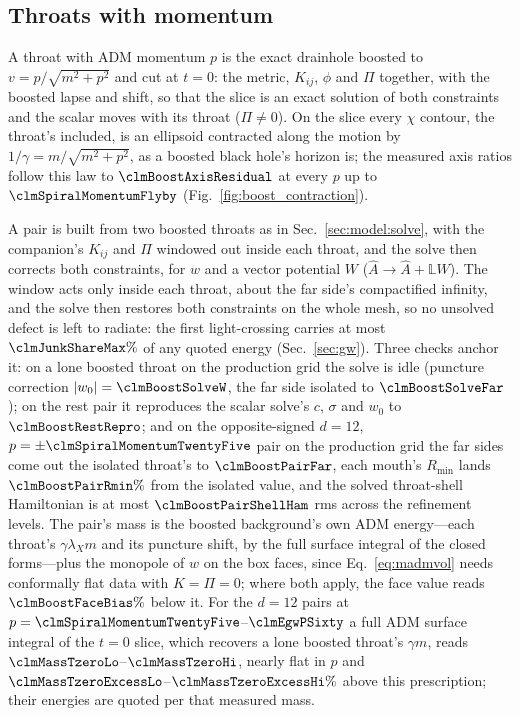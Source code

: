 \documentclass[twocolumn,floatfix,aps,prd,superscriptaddress,nofootinbib]{revtex4-2}
\begin{document}
\subsection{Throats with momentum}
\label{sec:model:boost}

A throat with ADM momentum $p$ is the exact drainhole boosted to $v=p/\sqrt{m^2+p^2}$ and cut at $t=0$: the metric, $K_{ij}$, $\phi$ and $\Pi$ together, with the boosted lapse and shift, so that the slice is an exact solution of both constraints and the scalar moves with its throat ($\Pi\neq0$). On the slice every $\chi$ contour, the throat's included, is an ellipsoid contracted along the motion by $1/\gamma=m/\sqrt{m^2+p^2}$, as a boosted black hole's horizon is; the measured axis ratios follow this law to $\clmBoostAxisResidual$ at every $p$ up to $\clmSpiralMomentumFlyby$ (Fig.~\ref{fig:boost_contraction}).

A pair is built from two boosted throats as in Sec.~\ref{sec:model:solve}, with the companion's $K_{ij}$ and $\Pi$ windowed out inside each throat, and the solve then corrects both constraints, for $w$ and a vector potential $W$ ($\hat A\to\hat A+\mathbb{L}W$). The window acts only inside each throat, about the far side's compactified infinity, and the solve then restores both constraints on the whole mesh, so no unsolved defect is left to radiate: the first light-crossing carries at most $\clmJunkShareMax\%$ of any quoted energy (Sec.~\ref{sec:gw}). Three checks anchor it: on a lone boosted throat on the production grid the solve is idle (puncture correction $|w_0|=\clmBoostSolveW$, the far side isolated to $\clmBoostSolveFar$); on the rest pair it reproduces the scalar solve's $c$, $\sigma$ and $w_0$ to $\clmBoostRestRepro$; and on the opposite-signed $d=12$, $p=\pm\clmSpiralMomentumTwentyFive$ pair on the production grid the far sides come out the isolated throat's to $\clmBoostPairFar$, each mouth's $R_{\min}$ lands $\clmBoostPairRmin\%$ from the isolated value, and the solved throat-shell Hamiltonian is at most $\clmBoostPairShellHam$ rms across the refinement levels. The pair's mass is the boosted background's own ADM energy---each throat's $\gamma\lambda_X m$ and its puncture shift, by the full surface integral of the closed forms---plus the monopole of $w$ on the box faces, since Eq.~\eqref{eq:madmvol} needs conformally flat data with $K=\Pi=0$; where both apply, the face value reads $\clmBoostFaceBias\%$ below it. For the $d=12$ pairs at $p=\clmSpiralMomentumTwentyFive$--$\clmEgwPSixty$ a full ADM surface integral of the $t=0$ slice, which recovers a lone boosted throat's $\gamma m$, reads $\clmMassTzeroLo$--$\clmMassTzeroHi$, nearly flat in $p$ and $\clmMassTzeroExcessLo$--$\clmMassTzeroExcessHi\%$ above this prescription; their energies are quoted per that measured mass.
\end{document}
